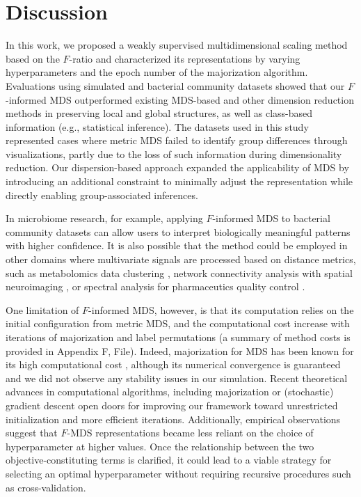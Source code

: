 \documentclass[10pt,letterpaper]{article}
\newcommand{\1}{{\rm 1}\kern-0.24em{\rm I}}
\begin{document}
\section*{Discussion}
In this work, we proposed a weakly supervised multidimensional scaling method based on the $F$-ratio and characterized its representations by varying hyperparameters and the epoch number of the majorization algorithm. Evaluations using simulated and bacterial community datasets showed that our $F$-informed MDS outperformed existing MDS-based and other dimension reduction methods in preserving local and global structures, as well as class-based information (e.g., statistical inference). The datasets used in this study represented cases where metric MDS failed to identify group differences through visualizations, partly due to the loss of such information during dimensionality reduction. Our dispersion-based approach expanded the applicability of MDS by introducing an additional constraint to minimally adjust the representation while directly enabling group-associated inferences.

In microbiome research, for example, applying $F$-informed MDS to bacterial community datasets can allow users to interpret biologically meaningful patterns with higher confidence. It is also possible that the method could be employed in other domains where multivariate signals are processed based on distance metrics, such as metabolomics data clustering \cite{Hansel25}, network connectivity analysis with spatial neuroimaging \cite{Kinsey24}, or spectral analysis for pharmaceutics quality control \cite{Puchert11}.

One limitation of $F$-informed MDS, however, is that its computation relies on the initial configuration from metric MDS, and the computational cost increase with iterations of majorization and label permutations (a summary of method costs is provided in Appendix F,  File). Indeed, majorization for MDS has been known for its high computational cost \cite{Fang25}, although its numerical convergence is guaranteed \cite{deleeuw24} and we did not observe any stability issues in our simulation. Recent theoretical advances in computational algorithms, including majorization \cite{Streeter23} or (stochastic) gradient descent \cite{Demaine21, zheng19} open doors for improving our framework toward unrestricted initialization and more efficient iterations. Additionally, empirical observations suggest that $F$-MDS representations became less reliant on the choice of hyperparameter at higher values. Once the relationship between the two objective-constituting terms is clarified, it could lead to a viable strategy for selecting an optimal hyperparameter without requiring recursive procedures such as cross-validation.
\end{document}

